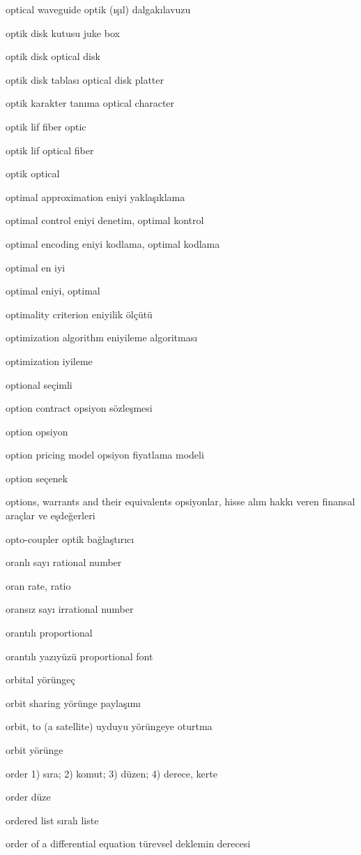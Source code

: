 \documentclass[12pt,fleqn]{article}\usepackage{../../common}
\begin{document}
optical waveguide optik (ışıl) dalgakılavuzu

optik disk kutusu juke box

optik disk optical disk

optik disk tablası optical disk platter

optik karakter tanıma optical character

optik lif fiber optic

optik lif optical fiber

optik optical

optimal approximation eniyi yaklaşıklama

optimal control eniyi denetim, optimal kontrol

optimal encoding eniyi kodlama, optimal kodlama

optimal en iyi

optimal eniyi, optimal

optimality criterion eniyilik ölçütü

optimization algorithm eniyileme algoritması

optimization iyileme

optional seçimli

option contract opsiyon sözleşmesi

option opsiyon

option pricing model opsiyon fiyatlama modeli

option seçenek

options, warrants and their equivalents opsiyonlar, hisse alım hakkı veren finansal araçlar ve eşdeğerleri

opto-coupler optik bağlaştırıcı

oranlı sayı rational number

oran rate, ratio

oransız sayı irrational number

orantılı proportional

orantılı yazıyüzü proportional font

orbital yörüngeç

orbit sharing yörünge paylaşımı

orbit, to (a satellite) uyduyu yörüngeye oturtma

orbit yörünge

order 1) sıra; 2) komut; 3) düzen; 4) derece, kerte

order düze

ordered list sıralı liste

order of a differential equation türevsel deklemin derecesi
\end{document}
